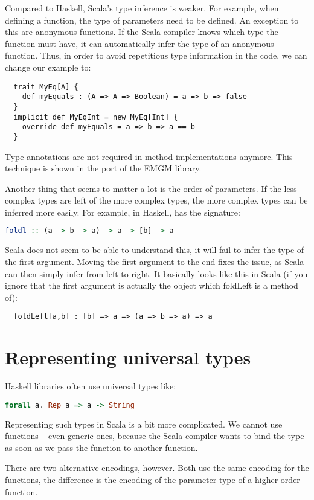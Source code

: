 Compared to Haskell, Scala's type inference is weaker. For example, when
defining a function, the type of parameters need to be defined. An exception
to this are anonymous functions. If the Scala compiler knows which type the
function must have, it can automatically infer the type of an anonymous
function. Thus, in order to avoid repetitious type information in the code,
we can change our  example to:
\begin{lstlisting}
  trait MyEq[A] {
    def myEquals : (A => A => Boolean) = a => b => false
  }
  implicit def MyEqInt = new MyEq[Int] {
    override def myEquals = a => b => a == b
  }
\end{lstlisting}
Type annotations are not required in method implementations anymore. This
technique is shown in the port of the EMGM library.

Another thing that seems to matter a lot is the order of parameters. If
the less complex types are left of the more complex types, the more
complex types can be inferred more easily. For example, in Haskell,
 has the signature:
\begin{lstlisting}[language=Haskell]
  foldl :: (a -> b -> a) -> a -> [b] -> a
\end{lstlisting}
Scala does not seem to be able to understand this, it will fail to
infer the type of the first argument. Moving the first argument to
the end fixes the issue, as Scala can then simply infer from left
to right. It basically looks like this in Scala (if you ignore that
the first argument is actually the object which foldLeft is a method
of):
\begin{lstlisting}
  foldLeft[a,b] : [b] => a => (a => b => a) => a
\end{lstlisting}

\section{Representing universal types}
\label{universal-types}
Haskell libraries often use universal types like:
\begin{lstlisting}[language=Haskell]
  forall a. Rep a => a -> String
\end{lstlisting}
Representing such types in Scala is a bit more complicated. We cannot use
functions -- even generic ones, because the Scala
compiler wants to bind the  type as soon as we pass the function to
another function.

There are two alternative encodings, however. Both use the same encoding for
the functions, the difference is the encoding of the parameter type of a higher
order function.


